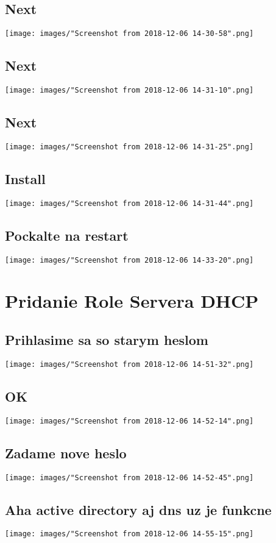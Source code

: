 \documentclass[slovak]{article}
\begin{document}
  \subsection{Next}
  \texttt{[image: images/"Screenshot from 2018-12-06 14-30-58".png]}
  \subsection{Next}
  \texttt{[image: images/"Screenshot from 2018-12-06 14-31-10".png]}
  \subsection{Next}
  \texttt{[image: images/"Screenshot from 2018-12-06 14-31-25".png]}
  \subsection{Install}
  \texttt{[image: images/"Screenshot from 2018-12-06 14-31-44".png]}
  \subsection{Pockalte na restart}
  \texttt{[image: images/"Screenshot from 2018-12-06 14-33-20".png]}
  

  \newpage
  \section{Pridanie Role Servera DHCP}
  \subsection{Prihlasime sa so starym heslom}
  \texttt{[image: images/"Screenshot from 2018-12-06 14-51-32".png]}
  \subsection{OK}
  \texttt{[image: images/"Screenshot from 2018-12-06 14-52-14".png]}
  \subsection{Zadame nove heslo}
  \texttt{[image: images/"Screenshot from 2018-12-06 14-52-45".png]}
  \subsection{Aha active directory aj dns uz je funkcne}
  \texttt{[image: images/"Screenshot from 2018-12-06 14-55-15".png]}
\end{document}
